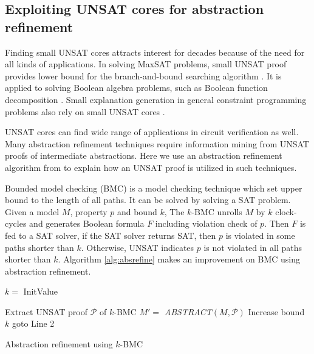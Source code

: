 \subsection{Exploiting UNSAT cores for abstraction refinement}
Finding small UNSAT cores attracts interest for decades because of the need for all kinds of applications.
In solving MaxSAT problems, small UNSAT proof provides lower bound for the branch-and-bound searching algorithm \cite{li2009maxsat}.
It is applied to solving Boolean algebra problems, such as Boolean function decomposition \cite{lee2008bi}. 
Small explanation generation in general constraint programming problems also rely on small UNSAT cores \cite{cambazard2008reformulating}.

UNSAT cores can find wide range of applications in circuit verification as well. Many abstraction refinement techniques require 
information mining from UNSAT proofs of intermediate abstractions. 
Here we use an abstraction refinement algorithm from \cite{zhang2005design} to explain how an UNSAT proof is
utilized in such techniques.

Bounded model checking (BMC) is a model checking technique which set upper bound to the length of all paths. 
It can be solved by solving a SAT problem. Given a model $M$, property $p$ and bound $k$, 
The $k$-BMC unrolls $M$ by $k$ clock-cycles and generates Boolean formula $F$ including violation check of $p$.
Then $F$ is fed to a SAT solver, if the SAT solver returns SAT, then $p$ is violated in 
some paths shorter than $k$. Otherwise, UNSAT indicates $p$ is not violated in all paths 
shorter than $k$. Algorithm \ref{alg:absrefine} makes an improvement on BMC using 
abstraction refinement.

\IncMargin{1em}
\begin{algorithm}[H]
\SetAlgoNoLine
\LinesNumbered
  $k = $ InitValue\;
  
  {
  }
  {
	Extract UNSAT proof $\mathcal P$ of $k$-BMC\;
	$M' = $ \textit{ABSTRACT}$(M,\mathcal P)$\;
  }
  {
  }
  {
	Increase bound $k$\;
	goto Line 2\;
  }
\caption {Abstraction refinement using $k$-BMC}\label{alg:absrefine}
\end{algorithm}
\DecMargin{1em}


